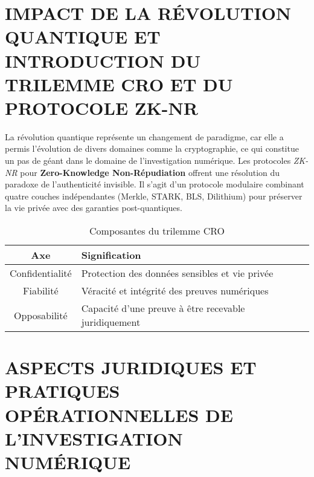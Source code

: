 \documentclass[12pt,a4paper]{article}
\begin{document}
	
	\newpage
	\section{IMPACT DE LA RÉVOLUTION QUANTIQUE ET INTRODUCTION DU TRILEMME CRO ET DU PROTOCOLE ZK-NR}
	La révolution quantique représente un changement de paradigme, car elle a permis l'évolution de divers domaines comme la cryptographie, ce qui constitue un pas de géant dans le domaine de l'investigation numérique. Les protocoles \emph{ZK-NR} pour \textbf{Zero-Knowledge Non-Répudiation} offrent une résolution du paradoxe de l'authenticité invisible. Il s'agit d'un protocole modulaire combinant quatre couches indépendantes (Merkle, STARK, BLS, Dilithium) pour préserver la vie privée avec des garanties post-quantiques. \\
	\begin{table}[h!]
		\centering
		\begin{tabularx}{\linewidth}{|c|X|}
			\hline
			\textbf{Axe} & \textbf{Signification} \\
			\hline
			Confidentialité & Protection des données sensibles et vie privée \\
			\hline
			Fiabilité & Véracité et intégrité des preuves numériques \\
			\hline
			Opposabilité & Capacité d’une preuve à être recevable juridiquement \\
			\hline
		\end{tabularx}
		\caption{Composantes du trilemme CRO}
	\end{table}
	

\newpage
\section{ASPECTS JURIDIQUES ET PRATIQUES \\ OPÉRATIONNELLES DE L'INVESTIGATION  \\ NUMÉRIQUE}
\end{document}
